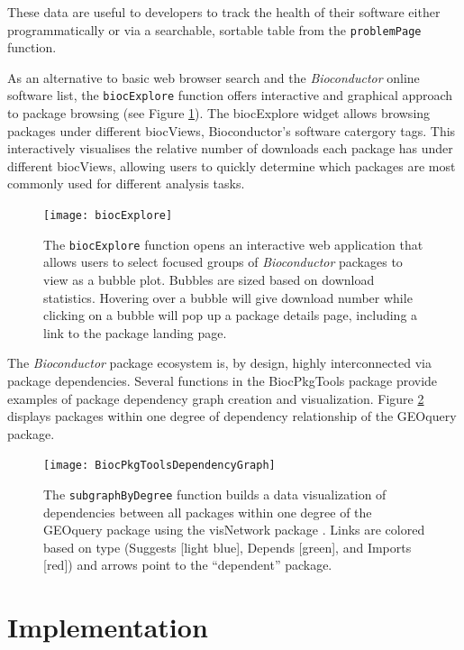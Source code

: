 \documentclass[9pt,a4paper]{extarticle}\usepackage[]{graphicx}\usepackage[]{color}
\begin{document}
These data are useful to developers to track the health of their
software either programmatically or via a searchable, sortable table
from the \texttt{problemPage} function.

As an alternative to basic web browser search and the
\emph{Bioconductor} online software list, the \texttt{biocExplore}
function offers interactive and graphical approach to package browsing
(see Figure \ref{fig:biocexplore}). The biocExplore widget allows browsing
packages under different biocViews, Bioconductor's software catergory tags. This
interactively visualises the relative number of downloads each package has under
different biocViews, allowing users to quickly determine which packages are most
commonly used for different analysis tasks.

\begin{figure}
  \texttt{[image: biocExplore]}
  \caption{The \texttt{biocExplore} function opens an interactive web application that allows users to select focused groups of \emph{Bioconductor} packages to view as a bubble plot. Bubbles are sized based on download statistics. Hovering over a bubble will give download number while clicking on a bubble will pop up a package details page, including a link to the package landing page.}
  \label{fig:biocexplore}
\end{figure}

The \emph{Bioconductor} package ecosystem is, by design, highly
interconnected via package dependencies. Several functions in the
BiocPkgTools package provide examples of package dependency graph
creation and visualization. Figure \ref{fig:dependencygraph} displays
packages within one degree of dependency relationship of the GEOquery
package.

\begin{figure}
  \texttt{[image: BiocPkgToolsDependencyGraph]}
  \caption{The \texttt{subgraphByDegree} function builds a data
    visualization of dependencies between all packages within one
    degree of the GEOquery package using the visNetwork package
    \citep{visNetwork}. Links are colored based on type (Suggests [light blue],
    Depends [green], and Imports [red]) and arrows point to the ``dependent''
    package. }
  \label{fig:dependencygraph}
\end{figure}

\section*{Implementation}
\end{document}
